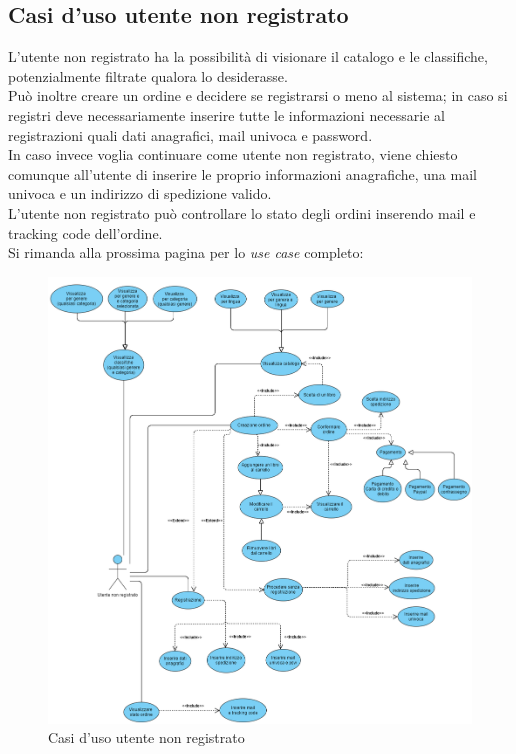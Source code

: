 \documentclass[a4paper,11pt]{report}
\begin{document}
\subsection{Casi d'uso utente non registrato}
L'utente non registrato ha la possibilità di visionare il catalogo e le classifiche, potenzialmente filtrate qualora lo desiderasse.\\
Può inoltre creare un ordine e decidere se registrarsi o meno al sistema; in caso si registri deve necessariamente inserire tutte le informazioni necessarie al registrazioni quali dati anagrafici, mail univoca e password.\\
In caso invece voglia continuare come utente non registrato, viene chiesto comunque all'utente di inserire le proprio informazioni anagrafiche, una mail univoca e un indirizzo di spedizione valido. \\
\newline
L'utente non registrato può controllare lo stato degli ordini inserendo mail e tracking code dell'ordine.\\
Si rimanda alla prossima pagina per lo \textit{use case} completo:
\newpage
    \begin{figure}[h!]
    	\centering
    	\hspace*{-0.8in}
    	\includegraphics[width=1.3\linewidth]{Use cases diagrams/utente non registrato.png} 
    	\caption{Casi d'uso utente non registrato}
    \end{figure}
\newpage
\end{document}
